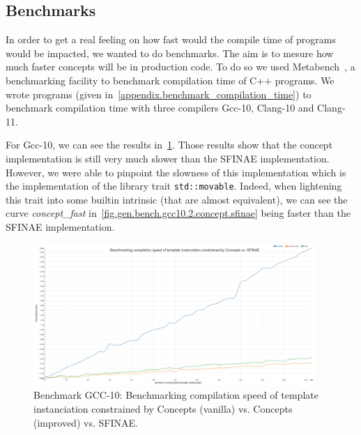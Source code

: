 \subsection{Benchmarks}
\label{genericity.postcpp11.subsec.benchmarks}


In order to get a real feeling on how fast would the compile time of programs would be impacted, we wanted to do
benchmarks. The aim is to mesure how much faster concepts will be in production code. To do so we used
Metabench~\parencite{dionne.2021.metabench}, a benchmarking facility to benchmark compilation time of C++ programs. We
wrote programs (given in~\cref{appendix.benchmark_compilation_time}) to benchmark compilation time with three compilers
Gcc-10, Clang-10 and Clang-11.

For Gcc-10, we can see the results in~\cref{fig.gen.bench.gcc10.1.concept.sfinae}. Those results show that the concept
implementation is still very much slower than the SFINAE implementation. However, we were able to pinpoint the slowness
of this implementation which is the implementation of the library trait \texttt{std::movable}. Indeed, when lightening
this trait into some builtin intrinsic (that are almost equivalent), we can see the curve \emph{concept\_fast}
in~\cref{fig.gen.bench.gcc10.2.concept.sfinae} being faster than the SFINAE implementation.

\begin{figure}[htb]
  \centering
  \includegraphics[width=4.2in]{figs/compile_time_benches/gcc10/chart.concept.png}
  \caption{Benchmark GCC-10: Benchmarking compilation speed of template instanciation constrained by Concepts (vanilla) vs. Concepts (improved) vs. SFINAE.}
  \label{fig.gen.bench.gcc10.1.concept.sfinae}
\end{figure}

